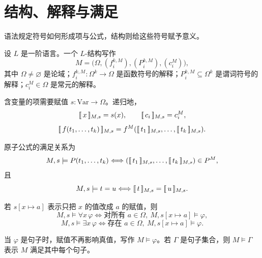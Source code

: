 \section{结构、解释与满足}\label{sec:semantics}

语法规定符号如何形成项与公式，结构则给这些符号赋予意义。

\begin{definition}[一阶结构]
设 $L$ 是一阶语言。一个 $L$-结构写作
\[
M=\bigl(\Omega,(f_i^{k,M}),(P_i^{k,M}),(c_i^M)\bigr),
\]
其中 $\Omega\neq\varnothing$ 是论域；$f_i^{k,M}:\Omega^k\to\Omega$ 是函数符号的解释；$P_i^{k,M}\subseteq\Omega^k$ 是谓词符号的解释；$c_i^M\in\Omega$ 是常元的解释。
\end{definition}

含变量的项需要赋值 $s:\mathrm{Var}\to\Omega$。递归地，
\[
[\![\,x\,]\!]_{M,s}=s(x),\qquad [\![\,c_i\,]\!]_{M,s}=c_i^M,
\]
\[
[\![\,f(t_1,\ldots,t_k)\,]\!]_{M,s}=f^M([\![\,t_1\,]\!]_{M,s},\ldots,[\![\,t_k\,]\!]_{M,s}).
\]

原子公式的满足关系为
\[
M,s\models P(t_1,\ldots,t_k)
\Longleftrightarrow
([\![\,t_1\,]\!]_{M,s},\ldots,[\![\,t_k\,]\!]_{M,s})\in P^M,
\]
且
\[
M,s\models t=u\Longleftrightarrow [\![\,t\,]\!]_{M,s}=[\![\,u\,]\!]_{M,s}.
\]

若 $s[x\mapsto a]$ 表示只把 $x$ 的值改成 $a$ 的赋值，则
\[
M,s\models\forall x\,\varphi\Longleftrightarrow
\text{对所有 }a\in\Omega,\ M,s[x\mapsto a]\models\varphi,
\]
\[
M,s\models\exists x\,\varphi\Longleftrightarrow
\text{存在 }a\in\Omega,\ M,s[x\mapsto a]\models\varphi.
\]

当 $\varphi$ 是句子时，赋值不再影响真值，写作 $M\models\varphi$。若 $\Gamma$ 是句子集合，则 $M\models\Gamma$ 表示 $M$ 满足其中每个句子。
